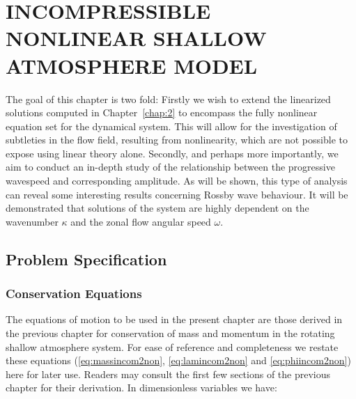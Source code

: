 
\chapter[INCOMPRESSIBLE NONLINEAR SHALLOW ATMOSPHERE MODEL]{INCOMPRESSIBLE NONLINEAR SHALLOW ATMOSPHERE MODEL}
\label{chap:3}
The goal of this chapter is two fold: Firstly we wish to extend the linearized solutions computed in Chapter~\ref{chap:2} to encompass the fully nonlinear equation set for the dynamical system. This will allow for the investigation of subtleties in the flow field, resulting from nonlinearity, which are not possible to expose using linear theory alone. Secondly, and perhaps more importantly, we aim to conduct an in-depth study of the relationship between the progressive wavespeed and corresponding amplitude. As will be shown, this type of analysis can reveal some interesting results concerning Rossby wave behaviour. It will be demonstrated that solutions of the system are highly dependent on the wavenumber $\kappa$ and the zonal flow angular speed $\omega$.
\section{Problem Specification}
\subsection{Conservation Equations}
The equations of motion to be used in the present chapter are those derived in the previous chapter for conservation of mass and momentum in the rotating shallow atmosphere system. For ease of reference and completeness we restate these equations (\eqref{eq:massincom2non}, \eqref{eq:lamincom2non} and \eqref{eq:phiincom2non}) here for later use. Readers may consult the first few sections of the previous chapter for their derivation. In dimensionless variables we have:

